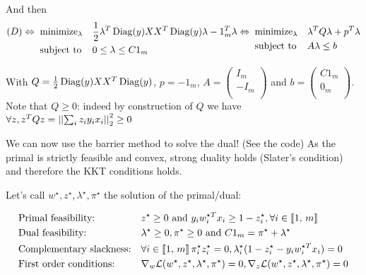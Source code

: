 \documentclass{article}
\begin{document}
And then
\begin{equation*}
    \begin{aligned}
        (D)\Leftrightarrow\;\; & \text{minimize}_{\lambda} &  & \frac{1}{2}\lambda^T \operatorname{Diag}(y) XX^T \operatorname{Diag}(y) \lambda - 1_m^T\lambda \\
                               & \text{subject to}         &  & 0 \le \lambda \le C1_m                                             \\
    \end{aligned}
    \;
    \begin{aligned}
        \Leftrightarrow\;\; & \text{minimize}_{\lambda} &  & \lambda^T Q \lambda + p^T\lambda \\
                            & \text{subject to}         &  & A\lambda \le b                   \\
    \end{aligned}
\end{equation*}

With $Q = \frac{1}{2}\operatorname{Diag}(y) XX^T \operatorname{Diag}(y)$, $p = - 1_m$, $A = \begin{pmatrix}
        I_m  \\
        -I_m \\
    \end{pmatrix}$ and $ b = \begin{pmatrix}
        C1_m \\
        0_m  \\
    \end{pmatrix}$. Note that $Q \ge 0$: indeed by construction of $Q$ we have $\forall z, z^TQz = \left|\left| \sum_i z_i y_i x_i \right|\right|_2^2 \ge 0$

\vspace{30px}

We can now use the barrier method to solve the dual! (See the code) As the primal is strictly feasible and convex, strong duality holds
(Slater's condition) and therefore the KKT conditions holds.

Let's call $w^\star, z^\star, \lambda^\star, \pi^\star$ the solution of the primal/dual:

\begin{equation*}
    \begin{aligned}
         & \text{Primal feasibility:}      &  & z^\star \ge 0 \text{ and } y_i w_i^{\star T} x_i \ge 1 - z^\star_i, \forall i \in \left\llbracket1,\, m\right\rrbracket                                             \\
         & \text{Dual feasibility:}        &  & \lambda^\star \ge 0, \pi^\star \ge 0 \text{ and } C1_m = \pi^\star + \lambda^\star                                                         \\
         & \text{Complementary slackness:} &  & \forall i \in \left\llbracket1,\, m\right\rrbracket \pi^\star_i z^\star_i = 0, \lambda^\star_i(1 - z^\star_i - y_i w_i^{\star T} x_i) = 0                           \\
         & \text{First order conditions:}  &  & \nabla_w \mathcal{L}(w^\star, z^\star, \lambda^\star, \pi^\star) = 0, \nabla_z \mathcal{L}(w^\star, z^\star, \lambda^\star, \pi^\star) = 0 \\
    \end{aligned}
\end{equation*}
\end{document}
